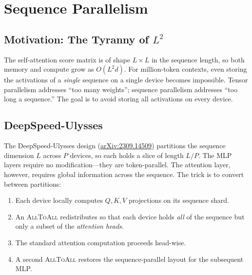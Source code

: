 \documentclass[11pt,a4paper]{article}
\theoremstyle{definition}
\theoremstyle{remark}
\theoremstyle{plain}
\begin{document}
\section{Sequence Parallelism}

\subsection{Motivation: The Tyranny of $L^2$}

The self-attention score matrix is of shape $L \times L$ in the sequence
length, so both memory and compute grow as $O(L^2 d)$. For million-token
contexts, even storing the activations of a \emph{single} sequence on a
single device becomes impossible. Tensor parallelism addresses ``too many
weights''; sequence parallelism addresses ``too long a sequence.'' The
goal is to avoid storing all activations on every device.

\subsection{DeepSpeed-Ulysses}

The DeepSpeed-Ulysses design
(\href{https://arxiv.org/abs/2309.14509}{arXiv:2309.14509}) partitions the
sequence dimension $L$ across $P$ devices, so each holds a slice of length
$L/P$. The MLP layers require no modification---they are token-parallel.
The attention layer, however, requires global information across the
sequence. The trick is to convert between partitions:

\begin{enumerate}[leftmargin=1.8em, itemsep=2pt]
    \item Each device locally computes $Q, K, V$ projections on its
    sequence shard.
    \item An \textsc{AllToAll} redistributes so that each device holds
    \emph{all} of the sequence but only a subset of the \emph{attention
    heads}.
    \item The standard attention computation proceeds head-wise.
    \item A second \textsc{AllToAll} restores the sequence-parallel layout
    for the subsequent MLP.
\end{enumerate}
\end{document}
